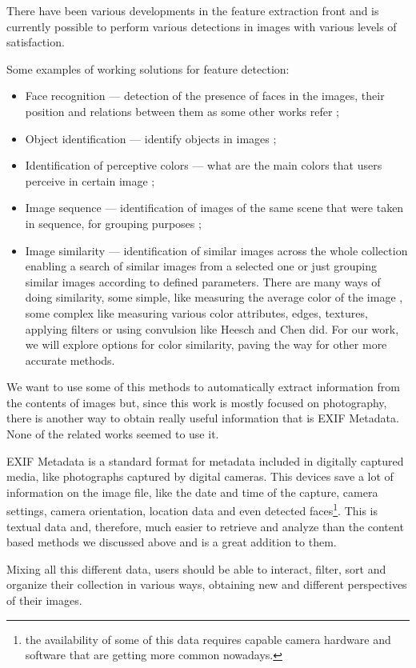 There have been various developments in the feature extraction front \cite{Liu:2007p3740,Datta:2005p3749,Rui:1999p949} and is currently possible to perform various detections in images with various levels of satisfaction.

Some examples of working solutions for feature detection:

\begin{itemize}
	\item{Face recognition — detection of the presence of faces in the images, their position and relations between them as some other works refer \cite{Vasconcelos:2005in,Chen:2003p3699,Tamura:2002p859,Hsu:2002p3675};}
	\item{Object identification — identify objects in images \cite{Torralba:2008p527};}
	\item{Identification of perceptive colors —  what are the main colors that users perceive in certain image \cite{Sural:2002bt,Tan:2001p850};}
	\item{Image sequence  —  identification of images of the same scene that were taken in sequence, for grouping purposes \cite{Cooper:2003p3679};}
	\item{Image similarity  —  identification of similar images across the whole collection enabling a search of similar images from a selected one or just grouping similar images according to defined parameters. There are many ways of doing similarity, some simple, like measuring the average color of the image \cite{Strong:2009p413,Qiu:2007p1207,Schaefer:2010p1871}, some complex like measuring various color attributes, edges, textures, applying filters or using convulsion like Heesch \cite{Heesch:2004p2675} and Chen \cite{Chen:1998p2344} did. For our work, we will explore options for color similarity, paving the way for other more accurate methods.}
\end{itemize}

We want to use some of this methods to automatically extract information from the contents of images but, since this work is mostly focused on photography, there is another way to obtain really useful information that is EXIF Metadata. None of the related works seemed to use it.

EXIF Metadata is a standard format for metadata included in digitally captured media, like photographs captured by digital cameras. This devices save a lot of information on the image file, like the date and time of the capture, camera settings, camera orientation, location data and even detected faces\footnote{the availability of some of this data requires capable camera hardware and software that are getting more common nowadays.}. This is textual data and, therefore, much easier to retrieve and analyze than the content based methods we discussed above and is a great addition to them.

Mixing all this different data, users should be able to interact, filter, sort and organize their collection in various ways, obtaining new and different perspectives of their images.



